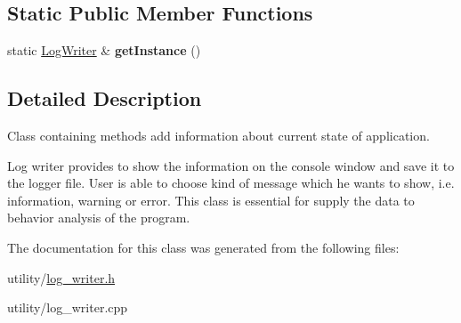 \subsection*{Static Public Member Functions}
\begin{DoxyCompactItemize}
\item 
\hypertarget{class_log_writer_a112a7c453bb431bd776a1486567a516a}{}\label{class_log_writer_a112a7c453bb431bd776a1486567a516a} 
static \hyperlink{class_log_writer}{Log\+Writer} \& {\bfseries get\+Instance} ()
\end{DoxyCompactItemize}


\subsection{Detailed Description}
Class containing methods add information about current state of application. 

Log writer provides to show the information on the console window and save it to the logger file. User is able to choose kind of message which he wants to show, i.\+e. information, warning or error. This class is essential for supply the data to behavior analysis of the program. 

The documentation for this class was generated from the following files\+:\begin{DoxyCompactItemize}
\item 
utility/\hyperlink{log__writer_8h}{log\+\_\+writer.\+h}\item 
utility/log\+\_\+writer.\+cpp\end{DoxyCompactItemize}
